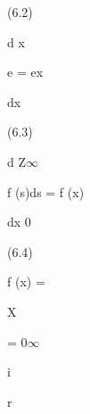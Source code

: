 \documentclass[a4paper,portrait,12pt]{article}
\begin{document}
(6.2)





\begin{flushleft}
d x
\end{flushleft}


\begin{flushleft}
e = ex
\end{flushleft}


\begin{flushleft}
dx
\end{flushleft}





(6.3)





\begin{flushleft}
d Z$\infty$
\end{flushleft}


\begin{flushleft}
f (s)ds = f (x)
\end{flushleft}


\begin{flushleft}
dx 0
\end{flushleft}





(6.4)





\begin{flushleft}
f (x) =
\end{flushleft}





\begin{flushleft}
X
\end{flushleft}





= 0$\infty$





\begin{flushleft}
i
\end{flushleft}





\begin{flushleft}
r
\end{flushleft}
\end{document}
